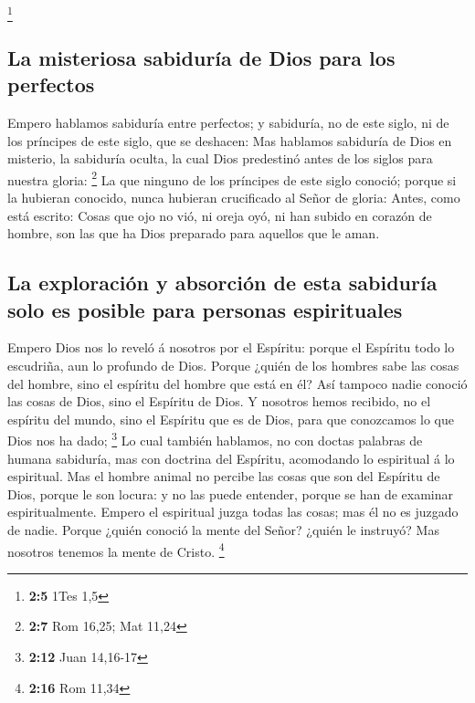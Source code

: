 \footnote{\textbf{2:5} 1Tes 1,5}

\hypertarget{la-misteriosa-sabiduruxeda-de-dios-para-los-perfectos}{%
\subsection{La misteriosa sabiduría de Dios para los
perfectos}\label{la-misteriosa-sabiduruxeda-de-dios-para-los-perfectos}}

 Empero hablamos sabiduría entre perfectos; y sabiduría,
no de este siglo, ni de los príncipes de este siglo, que se deshacen:
 Mas hablamos sabiduría de Dios en misterio, la sabiduría
oculta, la cual Dios predestinó antes de los siglos para nuestra gloria:
\footnote{\textbf{2:7} Rom 16,25; Mat 11,24}  La que
ninguno de los príncipes de este siglo conoció; porque si la hubieran
conocido, nunca hubieran crucificado al Señor de gloria: 
Antes, como está escrito: Cosas que ojo no vió, ni oreja oyó, ni han
subido en corazón de hombre, son las que ha Dios preparado para aquellos
que le aman.

\hypertarget{la-exploraciuxf3n-y-absorciuxf3n-de-esta-sabiduruxeda-solo-es-posible-para-personas-espirituales}{%
\subsection{La exploración y absorción de esta sabiduría solo es posible
para personas
espirituales}\label{la-exploraciuxf3n-y-absorciuxf3n-de-esta-sabiduruxeda-solo-es-posible-para-personas-espirituales}}

 Empero Dios nos lo reveló á nosotros por el Espíritu:
porque el Espíritu todo lo escudriña, aun lo profundo de Dios.
 Porque ¿quién de los hombres sabe las cosas del hombre,
sino el espíritu del hombre que está en él? Así tampoco nadie conoció
las cosas de Dios, sino el Espíritu de Dios.  Y nosotros
hemos recibido, no el espíritu del mundo, sino el Espíritu que es de
Dios, para que conozcamos lo que Dios nos ha dado; \footnote{\textbf{2:12}
  Juan 14,16-17}  Lo cual también hablamos, no con doctas
palabras de humana sabiduría, mas con doctrina del Espíritu, acomodando
lo espiritual á lo espiritual.  Mas el hombre animal no
percibe las cosas que son del Espíritu de Dios, porque le son locura: y
no las puede entender, porque se han de examinar espiritualmente.
 Empero el espiritual juzga todas las cosas; mas él no es
juzgado de nadie.  Porque ¿quién conoció la mente del
Señor? ¿quién le instruyó? Mas nosotros tenemos la mente de Cristo.
\footnote{\textbf{2:16} Rom 11,34}


